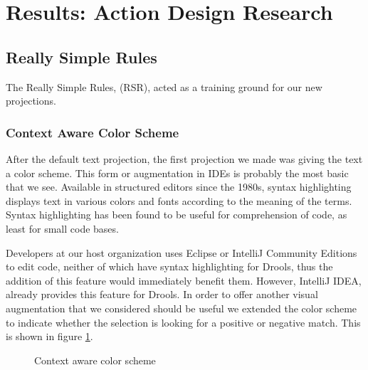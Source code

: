 \section{Results: Action Design Research}\label{section:Results_ADR}

\subsection{Really Simple Rules}

The Really Simple Rules, (RSR), acted as a training ground for our new projections.

\subsubsection{Context Aware Color Scheme}
After the default text projection, the first projection we made was giving the text a color scheme.
This form or augmentation in IDEs is probably the most basic that we see.
Available in structured editors since the 1980s\cite{cowlishaw1987lexx}, syntax highlighting displays text in various colors and fonts according to the meaning of the terms.
Syntax highlighting has been found to be useful for comprehension of code, as least for small code bases\cite{sarkar2015impact}.

Developers at our host organization uses Eclipse or IntelliJ Community Editions to edit code, neither of which have syntax highlighting for Drools, thus the addition of this feature would immediately benefit them.
However, IntelliJ IDEA, already provides this feature for Drools.
In order to offer another visual augmentation that we considered should be useful we extended the color scheme to indicate whether the selection is looking for a positive or negative match.
This is shown in figure \ref{fig:colorscheme}.

\begin{figure}[h]
    \centering
    \caption{Context aware color scheme}
    \label{fig:colorscheme}
\end{figure}

